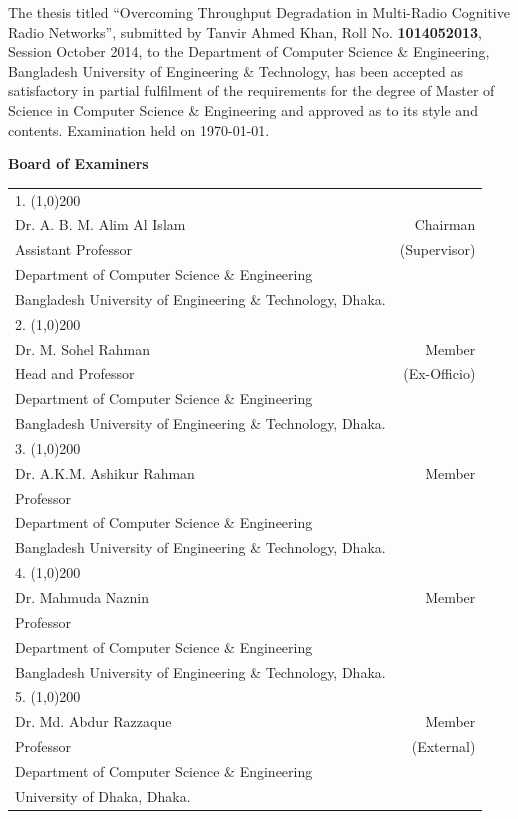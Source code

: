  { \singlespacing
 The thesis titled ``Overcoming Throughput Degradation in Multi-Radio Cognitive Radio Networks'', submitted by Tanvir Ahmed Khan, Roll No. \textbf{1014052013}, Session October 2014, to the Department of Computer Science \& Engineering, Bangladesh University of Engineering \& Technology, has been accepted as satisfactory in partial fulfilment of the requirements for the degree of Master of Science in Computer Science \& Engineering and approved as to its style and contents. Examination held on \today. \\
 \begin{center}
 	\textbf{\Large Board of Examiners}
 \end{center}
 \begin{tabular}{p{12cm} r }
 	\vspace{0.8cm}
 	1. \line(1,0){200} &  \\
 	Dr. A. B. M. Alim Al Islam & Chairman\\ 
 	Assistant Professor & (Supervisor)\\
 	Department of Computer Science \& Engineering & \\
 	Bangladesh University of Engineering \& Technology, Dhaka. & \\
 	\vspace{0.8cm}
 	2. \line(1,0){200} &  \\
 	Dr. M. Sohel Rahman  & Member \\ 
 	Head and Professor & (Ex-Officio)\\
 	Department of Computer Science \& Engineering & \\
 	Bangladesh University of Engineering \& Technology, Dhaka. & \\
 	\vspace{0.8cm}
 	3. \line(1,0){200} &  \\
 	Dr. A.K.M. Ashikur Rahman & Member\\ 
 	Professor &\\
 	Department of Computer Science \& Engineering & \\
 	Bangladesh University of Engineering \& Technology, Dhaka. & \\
 	\vspace{0.8cm}
 	4. \line(1,0){200} &  \\
 	Dr. Mahmuda Naznin & Member\\ 
 	Professor & \\
 	Department of Computer Science \& Engineering & \\
 	Bangladesh University of Engineering \& Technology, Dhaka. & \\
 	\vspace{0.8cm}
 	5. \line(1,0){200} &  \\
 	Dr. Md. Abdur Razzaque & Member\\ 
 	Professor & (External)\\
 	Department of Computer Science \& Engineering & \\
 	University of Dhaka, Dhaka. &\\
 \end{tabular}
 } 

